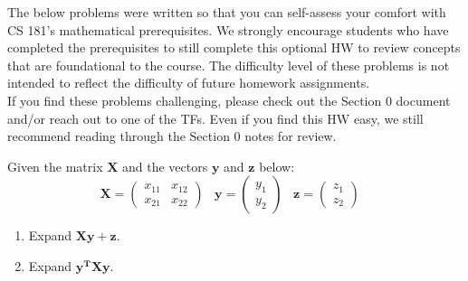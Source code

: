\documentclass{harvardml}
\theoremstyle{definition}
\theoremstyle{plain}
\begin{document}
\begin{center}

The below problems were written so that you can self-assess your comfort with CS 181's mathematical prerequisites.  We strongly encourage students who have completed the prerequisites to still complete this optional HW to review concepts that are foundational to the course.  The difficulty level of these problems is not intended to reflect the difficulty of future homework assignments.\\

If you find these problems challenging, please check out the Section 0 document and/or reach out to one of the TFs. Even if you find this HW easy, we still recommend reading through the Section 0 notes for review.

\end{center}

\begin{problem}
		    Given the matrix $\mathbf{X}$ and the vectors $\mathbf{y}$ and $\mathbf{z}$  below:
		    \begin{equation}
		        \mathbf{X} = \begin{pmatrix}
		        x_{11} & x_{12}\\
		        x_{21} & x_{22}
		        \end{pmatrix} \hspace{10pt} \mathbf{y} = \begin{pmatrix} y_{1} \\ y_{2} \end{pmatrix} \hspace{10pt} \mathbf{z} = \begin{pmatrix} z_{1} \\ z_{2} \end{pmatrix} \hspace{10pt} 
		    \end{equation}  
		    \begin{enumerate}[label=(\alph*)]
		        \item Expand $\mathbf{X}\mathbf{y} + \mathbf{z}$.
		        
		        \item Expand $\mathbf{y^T}\mathbf{X}\mathbf{y}$.

		    \end{enumerate}
		    
		
		\end{problem}
\end{document}
